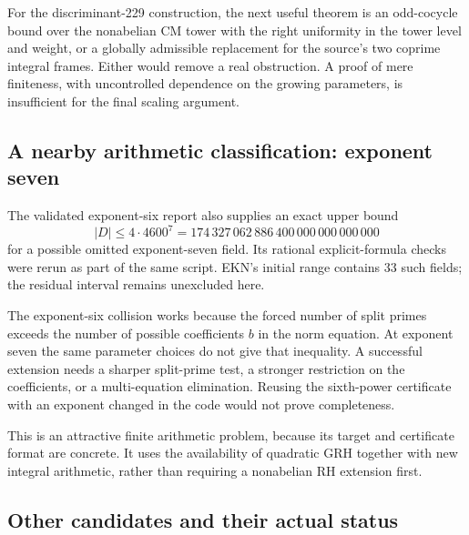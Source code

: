 For the discriminant-229 construction, the next useful theorem is an odd-cocycle bound over the nonabelian CM tower with the right uniformity in the tower level and weight, or a globally admissible replacement for the source's two coprime integral frames. Either would remove a real obstruction. A proof of mere finiteness, with uncontrolled dependence on the growing parameters, is insufficient for the final scaling argument.

\subsection{A nearby arithmetic classification: exponent seven}

The validated exponent-six report also supplies an exact upper bound
\[
 |D|\le4\cdot4600^7
 =174\,327\,062\,886\,400\,000\,000\,000\,000
\]
for a possible omitted exponent-seven field. Its rational explicit-formula checks were rerun as part of the same script. EKN's initial range contains 33 such fields; the residual interval remains unexcluded here.\cite{EKN,priorSix}

The exponent-six collision works because the forced number of split primes exceeds the number of possible coefficients $b$ in the norm equation. At exponent seven the same parameter choices do not give that inequality. A successful extension needs a sharper split-prime test, a stronger restriction on the coefficients, or a multi-equation elimination. Reusing the sixth-power certificate with an exponent changed in the code would not prove completeness.

This is an attractive finite arithmetic problem, because its target and certificate format are concrete. It uses the availability of quadratic GRH together with new integral arithmetic, rather than requiring a nonabelian RH extension first.

\subsection{Other candidates and their actual status}

